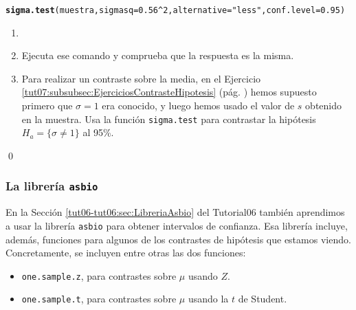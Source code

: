 \documentclass[10pt,a4paper]{article}\usepackage[]{graphicx}\usepackage[]{color}
\makeatletter
\newcommand{\hlnum}[1]{\textcolor[rgb]{0.686,0.059,0.569}{#1}}%
\newcommand{\hlstr}[1]{\textcolor[rgb]{0.192,0.494,0.8}{#1}}%
\newcommand{\hlopt}[1]{\textcolor[rgb]{0,0,0}{#1}}%
\newcommand{\hlstd}[1]{\textcolor[rgb]{0.345,0.345,0.345}{#1}}%
\newcommand{\hlkwc}[1]{\textcolor[rgb]{0.333,0.667,0.333}{#1}}%
\newcommand{\hlkwd}[1]{\textcolor[rgb]{0.737,0.353,0.396}{\textbf{#1}}}%
\newenvironment{kframe}{%
 \def\at@end@of@kframe{}%
 \ifinner\ifhmode%
  \def\at@end@of@kframe{\end{minipage}}%
  \begin{minipage}{\columnwidth}%
 \fi\fi%
 \def\FrameCommand##1{\hskip\@totalleftmargin \hskip-\fboxsep
 \colorbox{shadecolor}{##1}\hskip-\fboxsep
     \hskip-\linewidth \hskip-\@totalleftmargin \hskip\columnwidth}%
 \MakeFramed {\advance\hsize-\width
   \@totalleftmargin\z@ \linewidth\hsize
   \@setminipage}}%
 {\par\unskip\endMakeFramed%
 \at@end@of@kframe}
\newenvironment{knitrout}{}{} %
\newcounter {cont01}
\makeatother
\begin{document}
\begin{knitrout}
\color{fgcolor}\begin{kframe}
\begin{alltt}
\hlkwd{sigma.test}\hlstd{(muestra,}\hlkwc{sigmasq}\hlstd{=}\hlnum{0.56}\hlopt{^}\hlnum{2}\hlstd{,}\hlkwc{alternative}\hlstd{=}\hlstr{"less"}\hlstd{,}\hlkwc{conf.level}\hlstd{=}\hlnum{0.95}\hlstd{)}
\end{alltt}
\end{kframe}
\end{knitrout}


\begin{ejercicio}
\label{tut07:ejercicio14}
\begin{enumerate}
  \item[]
  \item Ejecuta ese comando y comprueba que la respuesta es la misma.

  \item Para realizar un contraste sobre la media, en el Ejercicio \ref{tut07:subsubsec:EjerciciosContrasteHipotesis} (pág. )  hemos supuesto primero que $\sigma=1$ era conocido, y luego hemos usado el valor de $s$ obtenido en la muestra. Usa la función {\tt sigma.test} para contrastar la hipótesis $H_a=\{\sigma \neq 1\}$ al 95\%.

\end{enumerate}

\qed
\end{ejercicio}




\subsubsection{La librería {\tt asbio}}\label{tut07:subsubsec:asbio}

En la Sección \ref{tut06-tut06:sec:LibreriaAsbio} del Tutorial06 también aprendimos a usar la librería {\tt asbio} para obtener intervalos de confianza. Esa librería incluye, además, funciones para algunos de los contrastes de hipótesis que estamos viendo. Concretamente, se incluyen entre otras las dos funciones:

\begin{itemize}
  \item {\tt one.sample.z}, para contrastes sobre $\mu$ usando $Z$.
  \item {\tt one.sample.t}, para contrastes sobre $\mu$ usando la $t$ de Student.
\end{itemize}
\end{document}
